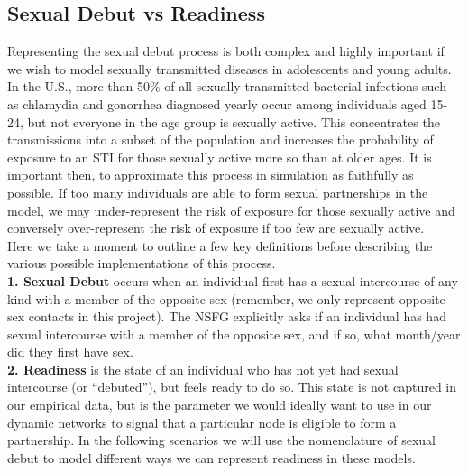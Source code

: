 \documentclass [11pt, proquest] {uwthesis}[2015/03/03]
\begin{document}
\hypertarget{sexual-debut-vs-readiness}{%
\subsection{Sexual Debut vs Readiness}\label{sexual-debut-vs-readiness}}

Representing the sexual debut process is both complex and highly important if we wish to model sexually transmitted diseases in adolescents and young adults. In the U.S., more than 50\% of all sexually transmitted bacterial infections such as chlamydia and gonorrhea diagnosed yearly occur among individuals aged 15-24, but not everyone in the age group is sexually active. This concentrates the transmissions into a subset of the population and increases the probability of exposure to an STI for those sexually active more so than at older ages. It is important then, to approximate this process in simulation as faithfully as possible. If too many individuals are able to form sexual partnerships in the model, we may under-represent the risk of exposure for those sexually active and conversely over-represent the risk of exposure if too few are sexually active.\\
Here we take a moment to outline a few key definitions before describing the various possible implementations of this process.\\
\textbf{1. Sexual Debut} occurs when an individual first has a sexual intercourse of any kind with a member of the opposite sex (remember, we only represent opposite-sex contacts in this project). The NSFG explicitly asks if an individual has had sexual intercourse with a member of the opposite sex, and if so, what month/year did they first have sex.\\
\textbf{2. Readiness} is the state of an individual who has not yet had sexual intercourse (or ``debuted''), but feels ready to do so. This state is not captured in our empirical data, but is the parameter we would ideally want to use in our dynamic networks to signal that a particular node is eligible to form a partnership. In the following scenarios we will use the nomenclature of sexual debut to model different ways we can represent readiness in these models.
\end{document}

